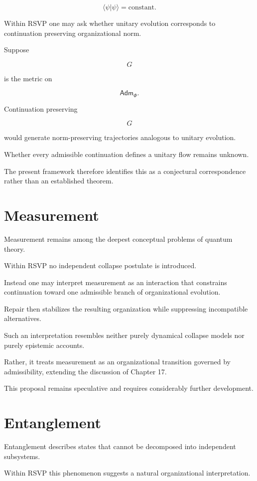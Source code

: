\documentclass[11pt,oneside]{book}
\numberwithin{equation}{chapter}
\theoremstyle{definition}
\theoremstyle{plain}
\newcommand{\Adm}{\mathsf{Adm}}
\begin{document}
\[
\langle\psi|\psi\rangle
=
\text{constant}.
\]

Within RSVP one may ask whether unitary evolution corresponds to
continuation preserving organizational norm.

Suppose

\[
G
\]

is the metric on

\[
\Adm_\Phi.
\]

Continuation preserving

\[
G
\]

would generate norm-preserving trajectories analogous to unitary evolution.

Whether every admissible continuation defines a unitary flow remains
unknown.

The present framework therefore identifies this as a conjectural
correspondence rather than an established theorem.

\section{Measurement}

Measurement remains among the deepest conceptual problems of quantum
theory.

Within RSVP no independent collapse postulate is introduced.

Instead one may interpret measurement as an interaction that constrains
continuation toward one admissible branch of organizational evolution.

Repair then stabilizes the resulting organization while suppressing
incompatible alternatives.

Such an interpretation resembles neither purely dynamical collapse models
nor purely epistemic accounts.

Rather, it treats measurement as an organizational transition governed by
admissibility, extending the discussion of Chapter 17.

This proposal remains speculative and requires considerably further
development.

\section{Entanglement}

Entanglement describes states that cannot be decomposed into independent
subsystems.

Within RSVP this phenomenon suggests a natural organizational
interpretation.
\end{document}
